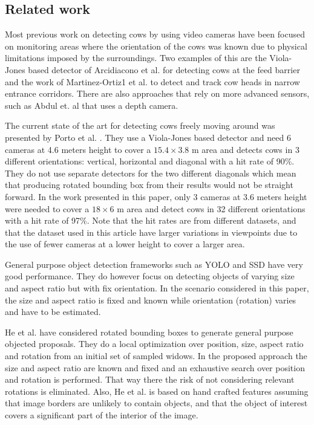 \documentclass{cta-author}
\begin{document}
\subsection{Related work}
Most previous work on detecting cows by using video cameras have been focused on monitoring areas where the orientation of the cows was known due to physical limitations imposed by the surroundings. Two examples of this are the Viola-Jones based detector of Arcidiacono et al. \cite{Arcidiacono2012} for detecting cows at the feed barrier and the work of Martinez-Ortiz1 et al. \cite{martinez2013video} to detect and track cow heads in narrow entrance corridors. There are also approaches that rely on more advanced sensors, such as Abdul et. al \cite{abdul2016locomotion} that uses a depth camera.

The current state of the art for detecting cows freely moving around was presented by Porto et al. \cite{porto2015automatic}. They use a Viola-Jones based detector and need 
6 cameras at 4.6 meters height to cover a $15.4 \times 3.8$ m area and detects cows in 3 different orientations: vertical, horizontal and diagonal with a hit rate of 90\%. They do not use separate detectors for the two different diagonals which mean that producing rotated bounding box from their results would not be straight forward. In the work presented in this paper, only 3 cameras at 3.6 meters height were needed to cover a $18 \times 6$ m area and detect cows in 32 different orientations with a hit rate of 97\%. Note that the hit rates are from different datasets, and that the dataset used in this article have larger variations in viewpoints due to the use of fewer cameras at a lower height to cover a larger area.

General purpose object detection frameworks such as YOLO \cite{DBLP:journals/corr/RedmonDGF15,redmon2016yolo9000} and SSD \cite{liu2016ssd} have very good performance. They do however focus on detecting objects of varying size and aspect ratio but with fix orientation. In the scenario considered in this paper, the size and aspect ratio is fixed and known while orientation (rotation) varies and have to be estimated. 

He et al. \cite{He_2015_ICCV} have considered rotated bounding boxes to generate general purpose objected proposals. They do a local optimization over position, size, aspect ratio and rotation from an initial set of sampled widows. In the proposed approach the size and aspect ratio are known and fixed and an exhaustive search over position and rotation is performed. That way there the risk of not considering relevant rotations is eliminated. Also, He et al. \cite{He_2015_ICCV}  is based on hand crafted features assuming that image borders are unlikely to contain objects, and that the object of interest covers a significant part of the interior of the image.
\end{document}
